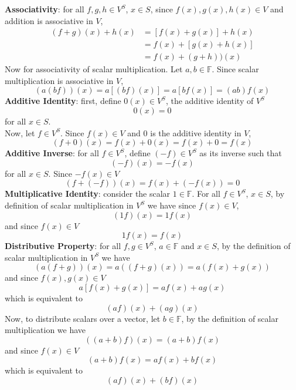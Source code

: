 \documentclass[12pt]{article}
\newcommand{\F}{\mathbb{F}}
\begin{document}
    \noindent \textbf{Associativity}: for all $f,g,h\in V^S$, $x\in S$, since $f(x),g(x),h(x)\in V$ and addition is associative in $V$,
    \begin{align*}
        (f+g)(x)+h(x)&=[f(x)+g(x)]+h(x)\\
        &=f(x)+[g(x)+h(x)]\\
        &=f(x)+(g+h))(x)
    \end{align*}
    Now for associativity of scalar multiplication. Let $a,b\in \F$. Since scalar multiplication is associative in $V$,
    \[(a(bf))(x)=a[(bf)(x)]=a[bf(x)]=(ab)f(x)\]
    \noindent \textbf{Additive Identity}: first, define $0(x)\in V^S$, the additive identity of $V^S$
    \[0(x)=0\]
    for all $x\in S$.\\
    Now, let $f\in V^S$. Since $f(x)\in V$ and $0$ is the additive identity in $V$, 
    \[(f+0)(x)=f(x)+0(x)=f(x)+0 = f(x)\]
    \noindent \textbf{Additive Inverse}: for all $f\in V^S$, define $(-f)\in V^S$ as its inverse such that
    \[(-f)(x)=-f(x)\]
    for all $x\in S$. Since $-f(x)\in V$
    \[(f+(-f))(x)=f(x)+(-f(x))=0\]
    \noindent \textbf{Multiplicative Identity}: consider the scalar $1\in \F$. For all $f\in V^S$, $x\in S$, by definition of scalar multiplication in $V^S$ we have
    since $f(x)\in V$,
    \[(1f)(x)=1f(x)\]
    and since $f(x)\in V$
    \[1f(x)=f(x)\]
    \noindent \textbf{Distributive Property}: for all $f,g\in V^S$, $a\in \F$ and $x\in S$, by the definition of scalar multiplication in $V^S$ we have
    \[(a(f+g))(x)=a((f+g)(x))=a(f(x)+g(x))\]
    and since $f(x),g(x)\in V$
    \[a[f(x)+g(x)]=af(x)+ag(x)\]
    which is equivalent to
    \[(af)(x)+(ag)(x)\]
    Now, to distribute scalars over a vector, let $b\in \F$, by the definition of scalar multiplication we have
    \[((a+b)f)(x)=(a+b)f(x)\]
    and since $f(x)\in V$
    \[(a+b)f(x)=af(x)+bf(x)\]
    which is equivalent to 
    \[(af)(x)+(bf)(x)\]
\end{document}
